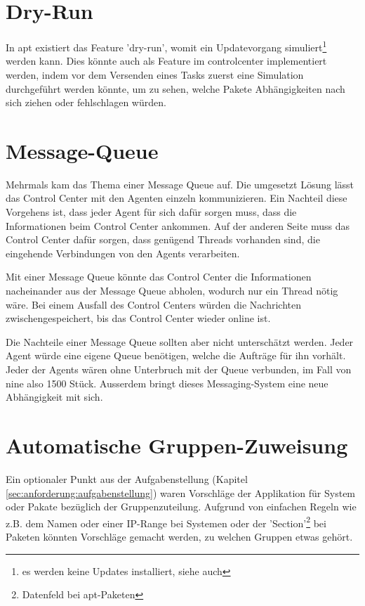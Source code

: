 \section{Dry-Run}

In \gls{apt} existiert das Feature 'dry-run', womit ein Updatevorgang simuliert\footnote{es werden keine Updates installiert, siehe auch } werden kann. Dies könnte auch als Feature im \gls{controlcenter} implementiert werden, indem vor dem Versenden eines Tasks zuerst eine Simulation durchgeführt werden könnte, um zu sehen, welche Pakete Abhängigkeiten nach sich ziehen oder fehlschlagen würden.

\section{Message-Queue} \label{sec:ausblick:message_queue}

Mehrmals kam das Thema einer Message Queue auf. Die umgesetzt Lösung lässt das Control Center mit den Agenten einzeln kommunizieren. Ein Nachteil diese Vorgehens ist, dass jeder Agent für sich dafür sorgen muss, dass die Informationen beim Control Center ankommen. Auf der anderen Seite muss das Control Center dafür sorgen, dass genügend Threads vorhanden sind, die eingehende Verbindungen von den Agents verarbeiten.

Mit einer Message Queue könnte das Control Center die Informationen nacheinander aus der Message Queue abholen, wodurch nur ein Thread nötig wäre. Bei einem Ausfall des Control Centers würden die Nachrichten zwischengespeichert, bis das Control Center wieder online ist.

Die Nachteile einer Message Queue sollten aber nicht unterschätzt werden. Jeder Agent würde eine eigene Queue benötigen, welche die Aufträge für ihn vorhält. Jeder der Agents wären ohne Unterbruch mit der Queue verbunden, im Fall von \gls{nine} also 1500 Stück. Ausserdem bringt dieses Messaging-System eine neue Abhängigkeit mit sich. 

\section{Automatische Gruppen-Zuweisung} \label{sec:ausblick:auto_group_assignment}

Ein optionaler Punkt aus der Aufgabenstellung (Kapitel \ref{sec:anforderung:aufgabenstellung}) waren Vorschläge der Applikation für System oder Pakate bezüglich der Gruppenzuteilung. Aufgrund von einfachen Regeln wie z.B. dem Namen oder einer IP-Range bei Systemen oder der 'Section'\footnote{Datenfeld bei apt-Paketen} bei Paketen könnten Vorschläge gemacht werden, zu welchen Gruppen etwas gehört.

